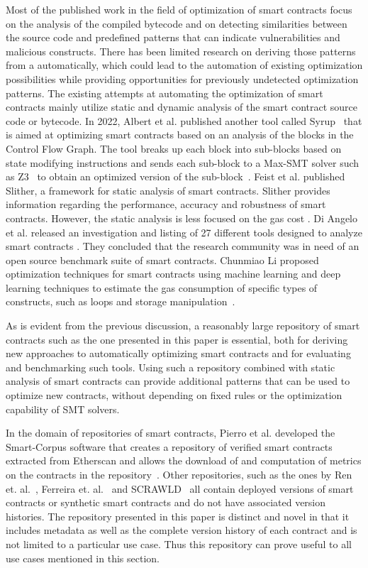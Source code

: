 \documentclass[10pt,conference]{IEEEtran}
\begin{document}
	Most of the published work in the field of optimization of smart contracts focus on the analysis of the compiled bytecode and on detecting similarities between the source code and predefined patterns that can indicate vulnerabilities and malicious constructs. There has been limited research on deriving those patterns from a automatically, which could lead to the automation of existing optimization possibilities while providing opportunities for previously undetected optimization patterns.  The existing attempts at automating the optimization of smart contracts mainly utilize static and dynamic analysis of the smart contract source code or bytecode. In 2022, Albert et al. published another tool called Syrup~\cite{superoptimization} that is aimed at optimizing smart contracts based on an analysis of the blocks in the Control Flow Graph. The tool breaks up each block into sub-blocks based on state modifying instructions and sends each sub-block to a Max-SMT solver such as Z3~\cite{z3solver} to obtain an optimized version of the sub-block~\cite{superoptimization}. Feist et al. published Slither, a framework for static analysis of smart contracts. Slither provides information regarding the performance, accuracy and robustness of smart contracts. However, the static analysis is less focused on the gas cost \cite{slither}. Di Angelo et al. released an investigation and listing of 27 different tools designed to analyze smart contracts \cite{diangelo}. They concluded that the research community was in need of an open source benchmark suite of smart contracts. Chunmiao Li proposed optimization techniques for smart contracts using machine learning and deep learning techniques to estimate the gas consumption of specific types of constructs, such as loops and storage manipulation~\cite{chunmiaoli}. 
	
	As is evident from the previous discussion, a reasonably large repository of smart contracts such as the one presented in this paper is essential, both for deriving new approaches to automatically optimizing smart contracts and for evaluating and benchmarking such tools. Using such a repository combined with static analysis of smart contracts can provide additional patterns that can be used to optimize new contracts, without depending on fixed rules or the optimization capability of SMT solvers.
	
	In the domain of repositories of smart contracts, Pierro et al. developed the Smart-Corpus software that creates a repository of verified smart contracts extracted from Etherscan and allows the download of and computation of metrics on the contracts in the repository~\cite{smartcorpus}. Other repositories, such as the ones by Ren et. al.~\cite{renrepo}, Ferreira et. al.~\cite{ferreirarepo} and SCRAWLD~\cite{scrawld} all contain deployed versions of smart contracts or synthetic smart contracts and do not have associated version histories. The repository presented in this paper is distinct and novel in that it includes metadata as well as the complete version history of each contract and is not limited to a particular use case. Thus this repository can prove useful to all use cases mentioned in this section. 
	
\end{document}
